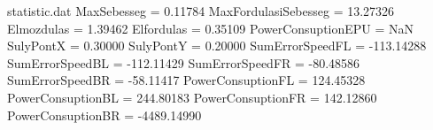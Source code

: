 \begin{filecontents*}{statistic.dat}
MaxSebesseg =    0.11784
MaxFordulasiSebesseg =   13.27326
Elmozdulas =    1.39462
Elfordulas =    0.35109
PowerConsuptionEPU =        NaN
SulyPontX =    0.30000
SulyPontY =    0.20000
SumErrorSpeedFL = -113.14288
SumErrorSpeedBL = -112.11429
SumErrorSpeedFR =  -80.48586
SumErrorSpeedBR =  -58.11417
PowerConsuptionFL =  124.45328
PowerConsuptionBL =  244.80183
PowerConsuptionFR =  142.12860
PowerConsuptionBR = -4489.14990
\end{filecontents*}
